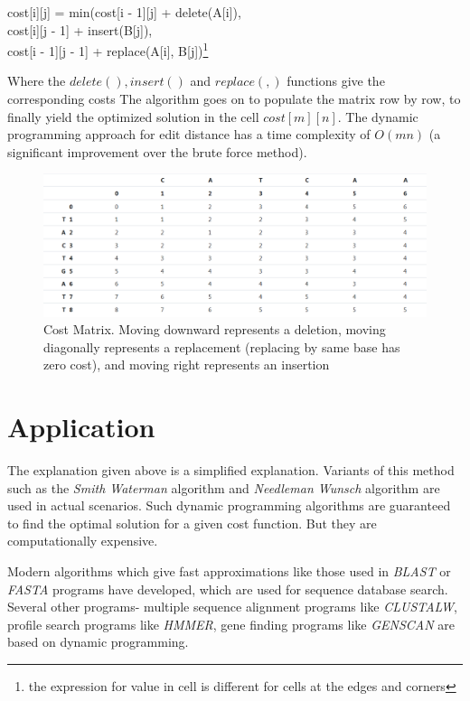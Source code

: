 \documentclass[11pt,a4paper]{article}
\begin{document}
	\begin{center}cost[i][j] = min(cost[i - 1][j] + delete(A[i]),\\
		cost[i][j - 1] + insert(B[j]),\\
					cost[i - 1][j - 1] + replace(A[i], B[j])\footnote{the expression for value in cell is different for cells at the edges and corners}

	\end{center}
			Where the $delete(), insert()$ and $replace(,)$ functions give the corresponding costs\cite{cs50} The algorithm goes on to populate the matrix row by row, to finally yield the optimized solution in the cell $cost[m][n]$. The dynamic programming approach for edit distance has a time complexity of $O(mn)$ (a significant improvement over the brute force method).
				\begin{figure}
					\includegraphics[width=\linewidth]{dpcost.png}
					\caption{Cost Matrix. Moving downward represents a deletion, moving diagonally represents a replacement (replacing by same base has zero cost), and moving right represents an insertion\cite{costmat}}
					\label{fig:costmatrix}
				\end{figure}

				\section{Application}

				The explanation given above is a simplified explanation. Variants of this method such as the \emph{Smith Waterman} algorithm and \emph{Needleman Wunsch} algorithm are used in actual scenarios. Such dynamic programming algorithms are guaranteed to find the optimal solution for a given cost function. But they are computationally expensive. 


				Modern algorithms which give fast approximations like those used in \emph{BLAST} or \emph{FASTA} programs have developed, which are used for sequence database search. Several other programs- multiple sequence alignment programs like \emph{CLUSTALW}, profile search programs like \emph{HMMER}, gene finding programs like \emph{GENSCAN} are based on dynamic programming.\cite{arti}
\end{document}
